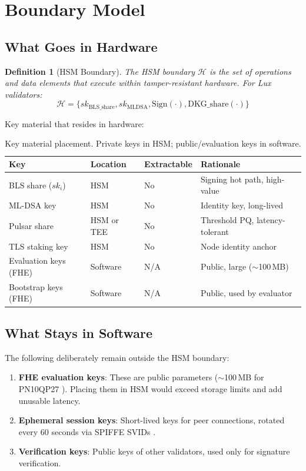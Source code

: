 \documentclass[11pt]{article}
\newtheorem{definition}{Definition}
\begin{document}
\section{Boundary Model}

\subsection{What Goes in Hardware}

\begin{definition}[HSM Boundary]
The HSM boundary $\mathcal{H}$ is the set of operations and data elements that execute within tamper-resistant hardware. For Lux validators:
$$\mathcal{H} = \{sk_{\text{BLS\_share}}, sk_{\text{MLDSA}}, \text{Sign}(\cdot), \text{DKG\_share}(\cdot)\}$$
\end{definition}

Key material that resides in hardware:
\begin{table}[h]
\centering
\small
\begin{tabular}{@{}llll@{}}
\toprule
\textbf{Key} & \textbf{Location} & \textbf{Extractable} & \textbf{Rationale} \\
\midrule
BLS share ($sk_i$) & HSM & No & Signing hot path, high-value \\
ML-DSA key & HSM & No & Identity key, long-lived \\
Pulsar share & HSM or TEE & No & Threshold PQ, latency-tolerant \\
TLS staking key & HSM & No & Node identity anchor \\
Evaluation keys (FHE) & Software & N/A & Public, large ($\sim$100\,MB) \\
Bootstrap keys (FHE) & Software & N/A & Public, used by evaluator \\
\bottomrule
\end{tabular}
\caption{Key material placement. Private keys in HSM; public/evaluation keys in software.}
\label{tab:key-placement}
\end{table}

\subsection{What Stays in Software}

The following deliberately remain outside the HSM boundary:
\begin{enumerate}
\item \textbf{FHE evaluation keys}: These are public parameters ($\sim$100\,MB for PN10QP27 \cite{fhe-api}). Placing them in HSM would exceed storage limits and add unusable latency.
\item \textbf{Ephemeral session keys}: Short-lived keys for peer connections, rotated every 60 seconds via SPIFFE SVIDs \cite{zero-trust}.
\item \textbf{Verification keys}: Public keys of other validators, used only for signature verification.
\end{enumerate}
\end{document}
